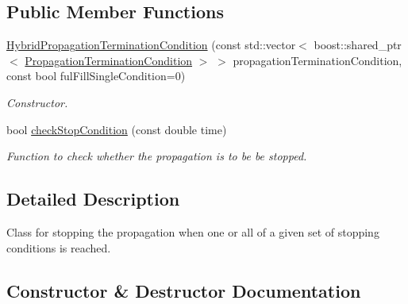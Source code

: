 \subsection*{Public Member Functions}
\begin{DoxyCompactItemize}
\item 
\hyperlink{classtudat_1_1propagators_1_1HybridPropagationTerminationCondition_a473bea81882bc00ae106eae021cf0001}{Hybrid\+Propagation\+Termination\+Condition} (const std\+::vector$<$ boost\+::shared\+\_\+ptr$<$ \hyperlink{classtudat_1_1propagators_1_1PropagationTerminationCondition}{Propagation\+Termination\+Condition} $>$ $>$ propagation\+Termination\+Condition, const bool ful\+Fill\+Single\+Condition=0)
\begin{DoxyCompactList}\small\item\em Constructor. \end{DoxyCompactList}\item 
bool \hyperlink{classtudat_1_1propagators_1_1HybridPropagationTerminationCondition_a951f0fa363f1a7f360c4c390fc09aa6d}{check\+Stop\+Condition} (const double time)
\begin{DoxyCompactList}\small\item\em Function to check whether the propagation is to be be stopped. \end{DoxyCompactList}\end{DoxyCompactItemize}


\subsection{Detailed Description}
Class for stopping the propagation when one or all of a given set of stopping conditions is reached. 

\subsection{Constructor \& Destructor Documentation}
